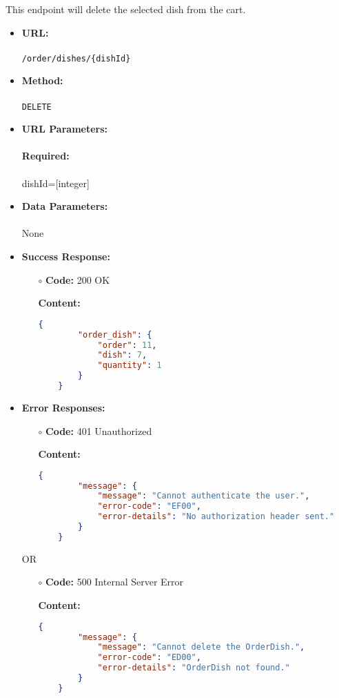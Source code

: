 

This endpoint will delete the selected dish from the cart.

\begin{itemize}
    \item \textbf{URL:} \\\\\texttt{/order/dishes/\{dishId\}}
    \item \textbf{Method:} \\\\\texttt{DELETE}
    \item \textbf{URL Parameters:} \\\\
	\textbf{Required:}\\\\
	dishId=[integer]
    \item \textbf{Data Parameters:} \\\\None
    \item \textbf{Success Response:}
		\begin{itemize}
			\item[$\circ$] \textbf{Code:} 200 OK
			\item[] \textbf{Content:}
			\medskip
			\begin{lstlisting}[language=json]
	{
		"order_dish": {
			"order": 11,
			"dish": 7,
			"quantity": 1
		}
	}
			\end{lstlisting}
		\end{itemize}
	   \item \textbf{Error Responses:}
    	\begin{itemize}
			\item[$\circ$] \textbf{Code:} 401 Unauthorized
			\item[] \textbf{Content:}
			\begin{lstlisting}[language=json]
	{
		"message": {
			"message": "Cannot authenticate the user.",
			"error-code": "EF00",
			"error-details": "No authorization header sent."
		}
	}
			\end{lstlisting}
		\end{itemize}
	OR
    	\begin{itemize}
			\item[$\circ$] \textbf{Code:} 500 Internal Server Error
			\item[] \textbf{Content:}
			\begin{lstlisting}[language=json]
	{
		"message": {
			"message": "Cannot delete the OrderDish.",
			"error-code": "ED00",
			"error-details": "OrderDish not found."
		}
	}
			\end{lstlisting}
		\end{itemize}
    					

\end{itemize}
